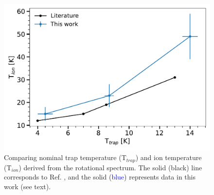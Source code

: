 \begin{figure}[!htb]
    \centering
    \includegraphics[scale=0.5]{figures/measurements/THz/CD+_Tcoll.pdf}
    \caption{Comparing nominal trap temperature (T$_{trap}$) and ion temperature (T$_{ion}$) derived from the rotational spectrum. The solid (black) line corresponds to Ref. \cite{kluge_state-selective_2016}, and the solid (\textcolor{blue}{blue}) represents data in this work (see text).}
    \label{fig:Tcoll}
\end{figure}